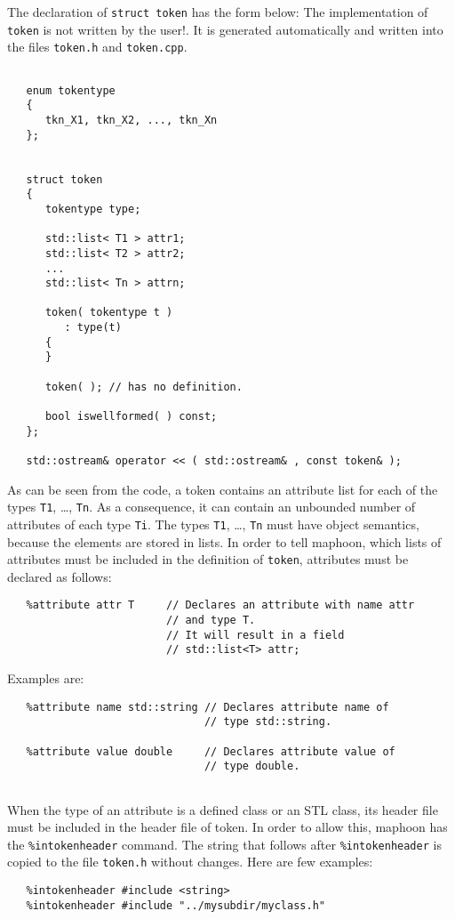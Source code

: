 \documentclass{article}
\begin{document}
\noindent
The declaration of \verb+struct token+ has the form below: 
The implementation of \verb+token+ is not written by the user!.
It is generated automatically and written into the
files \verb+token.h+ and \verb+token.cpp+.

\begin{verbatim}

   enum tokentype
   {
      tkn_X1, tkn_X2, ..., tkn_Xn
   };

   
   struct token
   {
      tokentype type;

      std::list< T1 > attr1;
      std::list< T2 > attr2;
      ...  
      std::list< Tn > attrn;

      token( tokentype t )
         : type(t)
      {
      }

      token( ); // has no definition. 

      bool iswellformed( ) const;
   };

   std::ostream& operator << ( std::ostream& , const token& );
\end{verbatim} 

\noindent
As can be seen from the code, a token contains an attribute list for
each of the types \verb+T1+, \ldots, \verb+Tn+.
As a consequence, it can contain an unbounded number of attributes
of each type \verb+Ti+.
The types \verb+T1+, \ldots, \verb+Tn+ must have object semantics,
because the elements are stored in lists. In order to 
tell maphoon, which lists of attributes must be included
in the definition of \verb+token+, attributes must
be declared as follows: 

\begin{verbatim}
   %attribute attr T     // Declares an attribute with name attr
                         // and type T.
                         // It will result in a field
                         // std::list<T> attr;
\end{verbatim}
Examples are:
\begin{verbatim}
   %attribute name std::string // Declares attribute name of
                               // type std::string.

   %attribute value double     // Declares attribute value of
                               // type double.
 
\end{verbatim}

\noindent
When the type of an attribute is a defined class or an STL class,
its header file must be included in the header file of token.
In order to allow this, maphoon has the
\verb+%intokenheader+ command. The string that follows after
\verb+%intokenheader+ is copied to the file \verb+token.h+ without
changes. Here are few examples:
\begin{verbatim}
   %intokenheader #include <string>
   %intokenheader #include "../mysubdir/myclass.h"
\end{verbatim}
\end{document}
